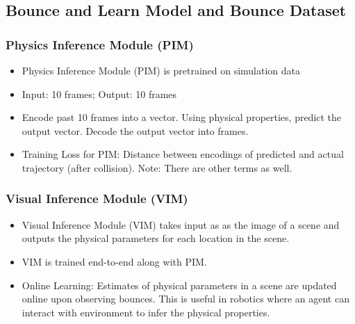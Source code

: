 \documentclass{article}
\begin{document}
    \subsection{Bounce and Learn Model and Bounce Dataset}\label{subsec:Bounce_and_Learn_Modeling_Scene_Dynamics_with_Real_World_Bounces_(ICLR_2019,_CMU):dataset}

    \subsubsection{Physics Inference Module (PIM)}\label{subsubsec:Bounce_and_Learn_Modeling_Scene_Dynamics_with_Real_World_Bounces_(ICLR_2019,_CMU):physics-inference-modulepim}
    \begin{itemize}
        \item Physics Inference Module (PIM) is pretrained on simulation data
        \item Input: 10 frames;
        Output: 10 frames
        \item Encode past 10 frames into a vector.
        Using physical properties, predict the output vector.
        Decode the output vector into frames.
        \item Training Loss for PIM: Distance between encodings of predicted and actual trajectory (after collision).
        Note: There are other terms as well.
    \end{itemize}

    \subsubsection{Visual Inference Module (VIM)}\label{subsubsec:Bounce_and_Learn_Modeling_Scene_Dynamics_with_Real_World_Bounces_(ICLR_2019,_CMU):vim}
    \begin{itemize}
        \item Visual Inference Module (VIM) takes input as as the image of a scene and outputs the physical parameters for each location in the scene.
        \item VIM is trained end-to-end along with PIM\@.
        \item Online Learning: Estimates of physical parameters in a scene are updated online upon observing bounces.
        This is useful in robotics where an agent can interact with environment to infer the physical properties.
    \end{itemize}
\end{document}

